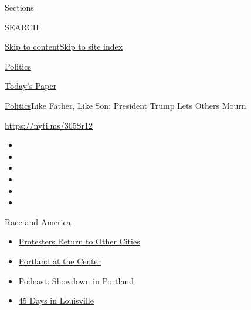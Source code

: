 Sections

SEARCH

\protect\hyperlink{site-content}{Skip to
content}\protect\hyperlink{site-index}{Skip to site index}

\href{https://www.nytimes.com/section/politics}{Politics}

\href{https://myaccount.nytimes.com/auth/login?response_type=cookie\&client_id=vi}{}

\href{https://www.nytimes.com/section/todayspaper}{Today's Paper}

\href{/section/politics}{Politics}\textbar{}Like Father, Like Son:
President Trump Lets Others Mourn

\url{https://nyti.ms/305Sr12}

\begin{itemize}
\item
\item
\item
\item
\item
\item
\end{itemize}

\href{https://www.nytimes.com/news-event/george-floyd-protests-minneapolis-new-york-los-angeles?action=click\&pgtype=Article\&state=default\&region=TOP_BANNER\&context=storylines_menu}{Race
and America}

\begin{itemize}
\tightlist
\item
  \href{https://www.nytimes.com/2020/07/26/us/protests-portland-seattle-trump.html?action=click\&pgtype=Article\&state=default\&region=TOP_BANNER\&context=storylines_menu}{Protesters
  Return to Other Cities}
\item
  \href{https://www.nytimes.com/2020/07/24/us/portland-oregon-protests-white-race.html?action=click\&pgtype=Article\&state=default\&region=TOP_BANNER\&context=storylines_menu}{Portland
  at the Center}
\item
  \href{https://www.nytimes.com/2020/07/23/podcasts/the-daily/portland-protests.html?action=click\&pgtype=Article\&state=default\&region=TOP_BANNER\&context=storylines_menu}{Podcast:
  Showdown in Portland}
\item
  \href{https://www.nytimes.com/interactive/2020/07/16/us/black-lives-matter-protests-louisville-breonna-taylor.html?action=click\&pgtype=Article\&state=default\&region=TOP_BANNER\&context=storylines_menu}{45
  Days in Louisville}
\end{itemize}

